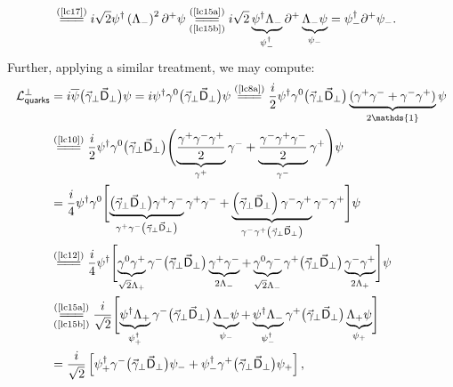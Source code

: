 \begin{note}
\begin{align*}
&\stackrel{(\text{\cref{lc17}})}{=\joinrel=\joinrel=}i\sqrt{2}\psi^\dag\left(\Lambda_-\right)^2\partial^+\psi\underset{(\text{\cref{lc15b}})}{\stackrel{(\text{\cref{lc15a}})}{=\joinrel=\joinrel=}}i\sqrt{2}\underbrace{\psi^\dag\Lambda_-}_{\psi_-^\dag}\partial^+\underbrace{\Lambda_-\psi}_{\psi_-}=\psi_-^\dag\partial^+\psi_-.
\end{align*}
Further, applying a similar treatment, we may compute:
\begin{align*}
\mathcal{L}_{\textsf{quarks}}^\perp&=i\overline{\psi}\big(\vec{\gamma}_\perp\vec{\textsf{D}}_\perp\big)\psi=i\psi^\dag\gamma^0\big(\vec{\gamma}_\perp\vec{\textsf{D}}_\perp\big)\psi\stackrel{(\text{\cref{lc8a}})}{=\joinrel=\joinrel=}\frac{i}{2}\psi^\dag\gamma^0\big(\vec{\gamma}_\perp\vec{\textsf{D}}_\perp\big)\underbrace{(\gamma^+\gamma^-+\gamma^-\gamma^+)}_{2\mathds{1}}\psi\\
&\stackrel{(\text{\cref{lc10}})}{=\joinrel=\joinrel=}\frac{i}{2}\psi^\dag\gamma^0\big(\vec{\gamma}_\perp\vec{\textsf{D}}_\perp\big)\Biggl(\underbrace{\frac{\gamma^+\gamma^-\gamma^+}{2}}_{\gamma^+}\gamma^-+\underbrace{\frac{\gamma^-\gamma^+\gamma^-}{2}}_{\gamma^-}\gamma^+\Biggr)\psi\\
&=\frac{i}{4}\psi^\dag\gamma^0\Biggl[\underbrace{\big(\vec{\gamma}_\perp\vec{\textsf{D}}_\perp\big)\gamma^+\gamma^-}_{\gamma^+\gamma^-\left(\vec{\gamma}_\perp\vec{\textsf{D}}_\perp\right)}\gamma^+\gamma^-+\underbrace{\left(\vec{\gamma}_\perp\vec{\textsf{D}}_\perp\right)\gamma^-\gamma^+}_{\gamma^-\gamma^+\left(\vec{\gamma}_\perp\vec{\textsf{D}}_\perp\right)}\gamma^-\gamma^+\Biggr]\psi\\
&\stackrel{(\text{\cref{lc12}})}{=\joinrel=\joinrel=}\frac{i}{4}\psi^\dag\Biggl[\underbrace{\gamma^0\gamma^+}_{\sqrt{2}\Lambda_+}\gamma^-\big(\vec{\gamma}_\perp\vec{\textsf{D}}_\perp\big)\underbrace{\gamma^+\gamma^-}_{2\Lambda_-}+\underbrace{\gamma^0\gamma^-}_{\sqrt{2}\Lambda_-}\gamma^+\big(\vec{\gamma}_\perp\vec{\textsf{D}}_\perp\big)\underbrace{\gamma^-\gamma^+}_{2\Lambda_+}\Biggr]\psi\\
&\underset{(\text{\cref{lc15b}})}{\stackrel{(\text{\cref{lc15a}})}{=\joinrel=\joinrel=}}\frac{i}{\sqrt{2}}\Biggl[\underbrace{\psi^\dag\Lambda_+}_{\psi^\dag_+}\gamma^-\big(\vec{\gamma}_\perp\vec{\textsf{D}}_\perp\big)\underbrace{\Lambda_-\psi}_{\psi_-}+\underbrace{\psi^\dag\Lambda_-}_{\psi^\dag_-}\gamma^+\big(\vec{\gamma}_\perp\vec{\textsf{D}}_\perp\big)\underbrace{\Lambda_+\psi}_{\psi_+}\Biggr]\\
&=\frac{i}{\sqrt{2}}\left[\psi_+^\dag\gamma^-\big(\vec{\gamma}_\perp\vec{\textsf{D}}_\perp\big)\psi_-+\psi_-^\dag\gamma^+\big(\vec{\gamma}_\perp\vec{\textsf{D}}_\perp\big)\psi_+\right],

\end{align*}
\end{note}
